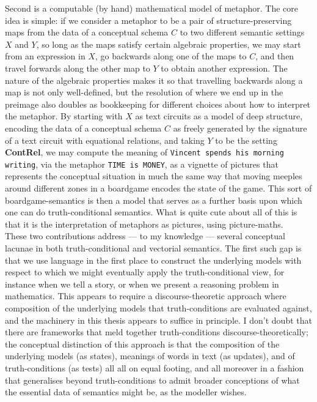 Second is a computable (by hand) mathematical model of metaphor. The core idea is simple: if we consider a metaphor to be a pair of structure-preserving maps from the data of a conceptual schema $C$ to two different semantic settings $X$ and $Y$, so long as the maps satisfy certain algebraic properties, we may start from an expression in $X$, go backwards along one of the maps to $C$, and then travel forwards along the other map to $Y$ to obtain another expression. The nature of the algebraic properties makes it so that travelling backwards along a map is not only well-defined, but the resolution of where we end up in the preimage also doubles as bookkeeping for different choices about how to interpret the metaphor. By starting with $X$ as text circuits as a model of deep structure, encoding the data of a conceptual schema $C$ as freely generated by the signature of a text circuit with equational relations, and taking $Y$ to be the setting \textbf{ContRel}, we may compute the meaning of \texttt{Vincent spends his morning writing}, via the metaphor \texttt{TIME is MONEY}, as a vignette of pictures that represents the conceptual situation in much the same way that moving meeples around different zones in a boardgame encodes the state of the game. This sort of boardgame-semantics is then a model that serves as a further basis upon which one can do truth-conditional semantics. What is quite cute about all of this is that it is the interpretation of metaphors as pictures, using picture-maths.\\

These two contributions address --- to my knowledge --- several conceptual lacunae in both truth-conditional and vectorial semantics. The first such gap is that we use language in the first place to construct the underlying models with respect to which we might eventually apply the truth-conditional view, for instance when we tell a story, or when we present a reasoning problem in mathematics. This appears to require a discourse-theoretic approach where composition of the underlying models that truth-conditions are evaluated against, and the machinery in this thesis appears to suffice in principle. I don't doubt that there are frameworks that meld together truth-conditions discourse-theoretically; the conceptual distinction of this approach is that the composition of the underlying models (as states), meanings of words in text (as updates), and of truth-conditions (as tests) all all on equal footing, and all moreover in a fashion that generalises beyond truth-conditions to admit broader conceptions of what the essential data of semantics might be, as the modeller wishes.\\

